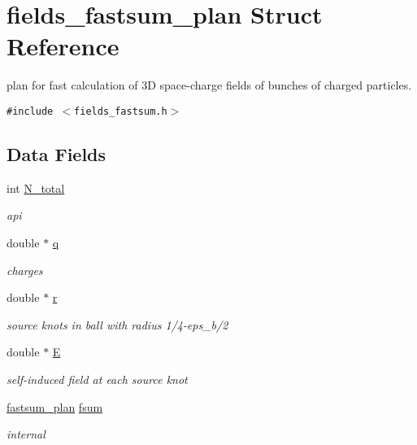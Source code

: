\hypertarget{structfields__fastsum__plan}{
\section{fields\_\-fastsum\_\-plan Struct Reference}
\label{structfields__fastsum__plan}
}
plan for fast calculation of 3D space-charge fields of bunches of charged particles.  


{\tt \#include $<$fields\_\-fastsum.h$>$}

\subsection*{Data Fields}
\begin{CompactItemize}
\item 
int \hyperlink{structfields__fastsum__plan_9e6c7fdded131315c670e971b29fb5e0}{N\_\-total}
\begin{CompactList}\small\item\em api \item\end{CompactList}\item 
\hypertarget{structfields__fastsum__plan_f4fa4d98cd696cbb734a85b154c1f86d}{
double $\ast$ \hyperlink{structfields__fastsum__plan_f4fa4d98cd696cbb734a85b154c1f86d}{q}}
\label{structfields__fastsum__plan_f4fa4d98cd696cbb734a85b154c1f86d}

\begin{CompactList}\small\item\em charges \item\end{CompactList}\item 
\hypertarget{structfields__fastsum__plan_14b91ce119e2a1926250d22ee4b47748}{
double $\ast$ \hyperlink{structfields__fastsum__plan_14b91ce119e2a1926250d22ee4b47748}{r}}
\label{structfields__fastsum__plan_14b91ce119e2a1926250d22ee4b47748}

\begin{CompactList}\small\item\em source knots in ball with radius 1/4-eps\_\-b/2 \item\end{CompactList}\item 
\hypertarget{structfields__fastsum__plan_77d68a77ebcefd9cf9d8ec75a5fd6007}{
double $\ast$ \hyperlink{structfields__fastsum__plan_77d68a77ebcefd9cf9d8ec75a5fd6007}{E}}
\label{structfields__fastsum__plan_77d68a77ebcefd9cf9d8ec75a5fd6007}

\begin{CompactList}\small\item\em self-induced field at each source knot \item\end{CompactList}\item 
\hyperlink{structfastsum__plan}{fastsum\_\-plan} \hyperlink{structfields__fastsum__plan_3d6cdb7e962a19abec6faa6e532e2745}{fsum}
\begin{CompactList}\small\item\em internal \item\end{CompactList}\end{CompactItemize}


